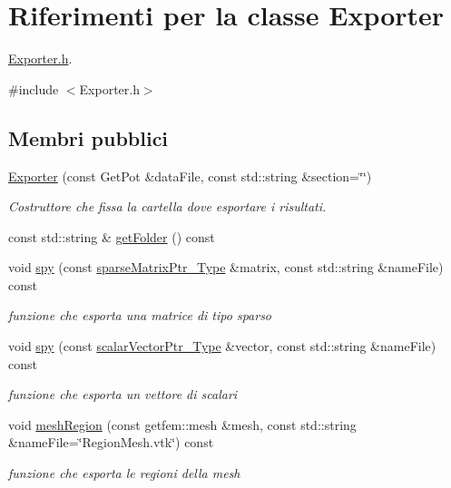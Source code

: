 \hypertarget{classExporter}{\section{Riferimenti per la classe Exporter}
\label{classExporter}
}


\hyperlink{Exporter_8h}{Exporter.\-h}.  




{\ttfamily \#include $<$Exporter.\-h$>$}

\subsection*{Membri pubblici}
\begin{DoxyCompactItemize}
\item 
\hyperlink{classExporter_a14a838ecbf8b9f5a370013430236081f}{Exporter} (const Get\-Pot \&data\-File, const std\-::string \&section=\char`\"{}\char`\"{})
\begin{DoxyCompactList}\small\item\em Costruttore che fissa la cartella dove esportare i risultati. \end{DoxyCompactList}\item 
const std\-::string \& \hyperlink{classExporter_a2771781a7f08fe8518973a6ba712a391}{get\-Folder} () const 
\item 
void \hyperlink{classExporter_a8ca0bdf8550569260ef4f3e39ab274dc}{spy} (const \hyperlink{Core_8h_a87137a9501b38c724ac80bc955164bb7}{sparse\-Matrix\-Ptr\-\_\-\-Type} \&matrix, const std\-::string \&name\-File) const 
\begin{DoxyCompactList}\small\item\em funzione che esporta una matrice di tipo sparso \end{DoxyCompactList}\item 
void \hyperlink{classExporter_ab5452c31e85ecfbbda8623aa20723e68}{spy} (const \hyperlink{Core_8h_ab09b6fa3c23db1b8c60456f8690c44a7}{scalar\-Vector\-Ptr\-\_\-\-Type} \&vector, const std\-::string \&name\-File) const 
\begin{DoxyCompactList}\small\item\em funzione che esporta un vettore di scalari \end{DoxyCompactList}\item 
void \hyperlink{classExporter_af02a2344019769ab23d9ac673a7b3709}{mesh\-Region} (const getfem\-::mesh \&mesh, const std\-::string \&name\-File=\char`\"{}Region\-Mesh.\-vtk\char`\"{}) const 
\begin{DoxyCompactList}\small\item\em funzione che esporta le regioni della mesh \end{DoxyCompactList}\end{DoxyCompactItemize}


